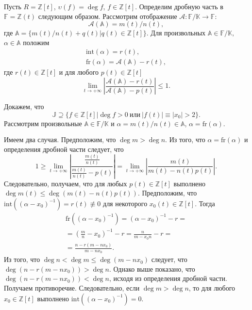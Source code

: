\documentclass[_00_dissertation.tex]{subfiles}
\begin{document}
\begin{example}\label{example:Z[t]}
    Пусть $R = \mathbb{Z}[t]$, $\upsilon(f)=\deg f$, $f \in \mathbb{Z}[t]$.
    Определим дробную часть в $\mathbb{F}=\mathbb{Z}(t)$ следующим образом.
    Рассмотрим отображение $\mathcal{A}:\mathbb{F}/\mathbb{K}\to\mathbb{F}$:
    \begin{equation*}
        \mathcal{A}(\mathbb{A})=m(t)/n(t),
    \end{equation*}
    где $\mathbb{A}=\{m(t)/n(t)+q(t)|q(t)\in\mathbb{Z}[t]\}.$
    Для произвольных $\mathbb{A}\in\mathbb{F}/\mathbb{K},$ $\alpha\in\mathbb{A}$ положим
    \begin{equation*}
        \begin{array}{c}
            \textrm{int}(\alpha)=r(t),\\
            \textrm{fr}(\alpha)=\mathcal{A}(\mathbb{A})-r(t),
        \end{array}
    \end{equation*}
    где $r(t)\in\mathbb{Z}[t]$ и для любого $p(t)\in\mathbb{Z}[t]$
    \begin{equation*}
        \lim_{t\to+\infty}\left|\frac{\mathcal{A}(\mathbb{A})-r(t)}{\mathcal{A}(\mathbb{A})-p(t)}\right|\le 1.
    \end{equation*}

    Докажем, что
    \begin{equation*}
        \mathbb{J}\supseteq\{f\in\mathbb{Z}[t]|\deg f>0\ \textrm{или}\ |f(t)|\equiv|x_{0}|>2\}.
    \end{equation*}
    Рассмотрим произвольные $\mathbb{A}\in\mathbb{F}/\mathbb{K}$ и $\alpha=m(t)/n(t)\in\mathbb{A}$, $\alpha=\textrm{fr}(\alpha)$.

    Имеем два случая.
    Предположим, что $\deg m > \deg n$.
    Из того, что $\alpha=\textrm{fr}(\alpha)$ и определения дробной части следует, что
    \begin{equation*}
        1 \ge \lim_{t\to+\infty}\left|\frac{\frac{m(t)}{n(t)}}{\frac{m(t)}{n(t)} - p(t)}\right| = \lim_{t\to+\infty}\left|\frac{m(t)}{m(t) - n(t)p(t)}\right|.
    \end{equation*}
    Следовательно, получаем, что для любых $p(t)\in \mathbb{Z}[t]$ выполнено $\deg m(t) \le \deg(m(t) - n(t)p(t))$.
    Предположим, что $\textrm{int}((\alpha-x_{0})^{-1})=r(t)\not\equiv0$ для некоторого $x_{0}(t)\in\mathbb{Z}[t]$.
    Тогда
    \begin{equation*}
        \begin{split}
            \textrm{fr}((\alpha - x_{0})^{-1}) = (\alpha - x_0)^{-1} - r =\\
            = \left(\frac{m}{n} - x_0\right)^{-1} - r = \frac{n}{m - x_0 n} - r =\\
            = \frac{n - r(m - nx_{0})}{m - nx_{0}}.
        \end{split}
    \end{equation*}
    Из того, что $\deg n < \deg m\le \deg(m-nx_{0})$ следует, что $\deg(n-r(m-nx_{0})) > \deg n$.
    Однако выше показано, что $\deg(n-r(m-nx_{0})) < \deg n$, исходя из определения дробной части.
    Получаем противоречие.
    Следовательно, если $\deg m > \deg n$, то для любого $x_0 \in \mathbb{Z}[t]$ выполнено $\textrm{int}((\alpha-x_{0})^{-1}) = 0$.


\end{example}
\end{document}
